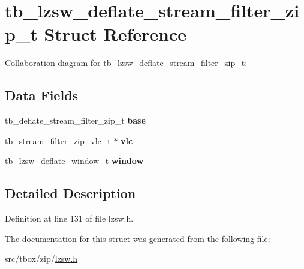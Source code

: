 \hypertarget{structtb__lzsw__deflate__stream__filter__zip__t}{\section{tb\-\_\-lzsw\-\_\-deflate\-\_\-stream\-\_\-filter\-\_\-zip\-\_\-t Struct Reference}
\label{structtb__lzsw__deflate__stream__filter__zip__t}
}


Collaboration diagram for tb\-\_\-lzsw\-\_\-deflate\-\_\-stream\-\_\-filter\-\_\-zip\-\_\-t\-:
\subsection*{Data Fields}
\begin{DoxyCompactItemize}
\item 
\hypertarget{structtb__lzsw__deflate__stream__filter__zip__t_a6c3d186a96e18cb25c9dfb86b04beb25}{tb\-\_\-deflate\-\_\-stream\-\_\-filter\-\_\-zip\-\_\-t {\bfseries base}}\label{structtb__lzsw__deflate__stream__filter__zip__t_a6c3d186a96e18cb25c9dfb86b04beb25}

\item 
\hypertarget{structtb__lzsw__deflate__stream__filter__zip__t_add899db66d5cf71bf7a5559f163beee0}{tb\-\_\-stream\-\_\-filter\-\_\-zip\-\_\-vlc\-\_\-t $\ast$ {\bfseries vlc}}\label{structtb__lzsw__deflate__stream__filter__zip__t_add899db66d5cf71bf7a5559f163beee0}

\item 
\hypertarget{structtb__lzsw__deflate__stream__filter__zip__t_a374f0466a6e316b711ba178a8d918353}{\hyperlink{structtb__lzsw__deflate__window__t}{tb\-\_\-lzsw\-\_\-deflate\-\_\-window\-\_\-t} {\bfseries window}}\label{structtb__lzsw__deflate__stream__filter__zip__t_a374f0466a6e316b711ba178a8d918353}

\end{DoxyCompactItemize}


\subsection{Detailed Description}


Definition at line 131 of file lzsw.\-h.



The documentation for this struct was generated from the following file\-:\begin{DoxyCompactItemize}
\item 
src/tbox/zip/\hyperlink{lzsw_8h}{lzsw.\-h}\end{DoxyCompactItemize}
